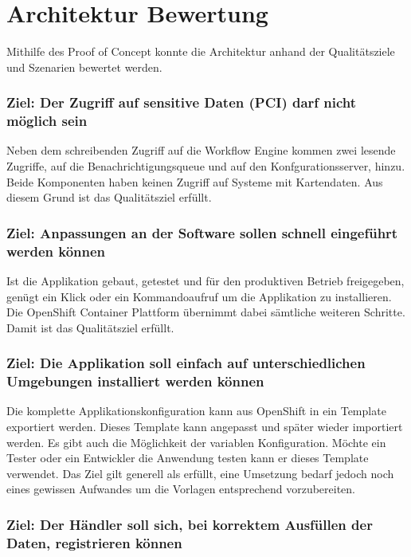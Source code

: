 \section{Architektur Bewertung}

Mithilfe des Proof of Concept konnte die Architektur anhand der Qualitätsziele und Szenarien bewertet werden.

\subsubsection{Ziel: Der Zugriff auf sensitive Daten (PCI) darf nicht möglich sein}

Neben dem schreibenden Zugriff auf die Workflow Engine kommen zwei lesende Zugriffe, auf die Benachrichtigungsqueue und auf den Konfgurationsserver, hinzu. Beide Komponenten haben keinen Zugriff auf Systeme mit Kartendaten. Aus diesem Grund ist das Qualitätsziel erfüllt.

\subsubsection{Ziel: Anpassungen an der Software sollen schnell eingeführt werden können}

Ist die Applikation gebaut, getestet und für den produktiven Betrieb freigegeben, genügt ein Klick oder ein Kommandoaufruf um die Applikation zu installieren. Die OpenShift Container Plattform übernimmt dabei sämtliche weiteren Schritte. Damit ist das Qualitätsziel erfüllt.

\subsubsection{Ziel: Die Applikation soll einfach auf unterschiedlichen Umgebungen installiert werden können}

Die komplette Applikationskonfiguration kann aus OpenShift in ein Template exportiert werden. Dieses Template kann angepasst und später wieder importiert werden. Es gibt auch die Möglichkeit der variablen Konfiguration. Möchte ein Tester oder ein Entwickler die Anwendung testen kann er dieses Template verwendet. Das Ziel gilt generell als erfüllt, eine Umsetzung bedarf jedoch noch eines gewissen Aufwandes um die Vorlagen entsprechend vorzubereiten.

\subsubsection{Ziel: Der Händler soll sich, bei korrektem Ausfüllen der Daten, registrieren können}

